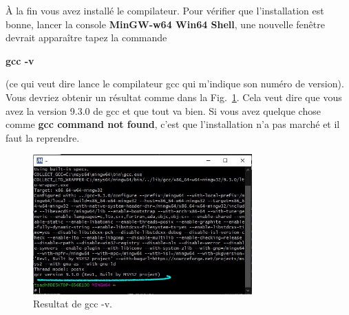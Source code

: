 \documentclass{article}
\newcommand\fig[1]{{Fig.~\ref{#1}}}
\begin{document}
À la fin vous avez installé le compilateur. Pour vérifier que l'installation est bonne, lancer la console {\color{MidnightBlue}\textbf{MinGW-w64 Win64 Shell}}, une nouvelle fenêtre devrait apparaître tapez la commande 
\begin{tcolorbox}[width=\textwidth,colframe=MidnightBlue,colback={black},title={Ceci est la console MinGW-w64 Win64 Shell},outer arc=0mm,colupper=white]    
      \large\textbf{gcc -v}
\end{tcolorbox}
(ce qui veut dire lance le compilateur gcc qui m'indique son numéro de version). Vous devriez obtenir un résultat comme dans la \fig{F:gccVersion}. Cela veut dire que vous avez la version 9.3.0 de gcc et que tout va bien. Si vous avez  quelque chose comme \textbf{gcc command not found}, c'est que l'installation n'a pas marché et il faut la reprendre.
\begin{figure}[H]
\center
\includegraphics[width=0.75\textwidth]{Plots/Msys2Con_13Gnu.jpg}
\caption{Resultat de gcc -v.\label{F:gccVersion}}
\end{figure}
\end{document}
